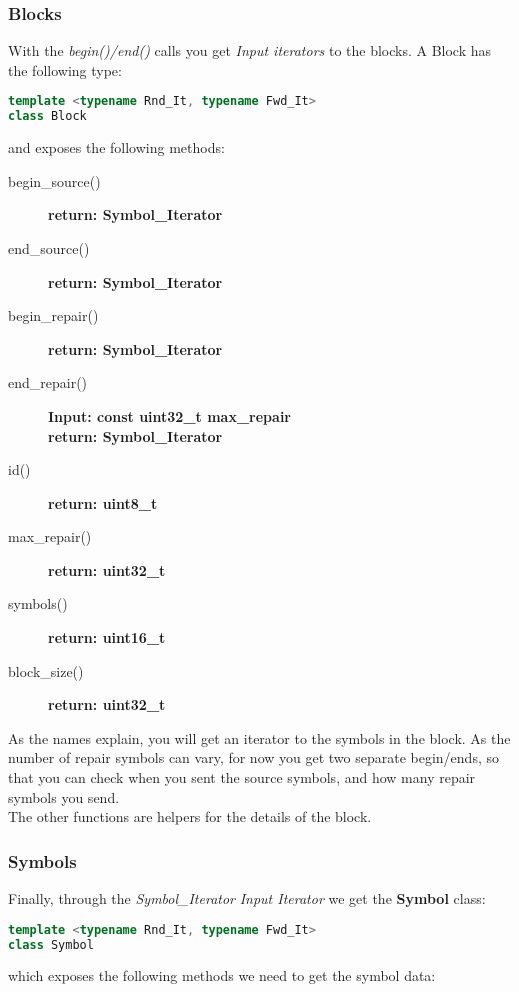 \documentclass[11pt,a4paper]{refart}
\begin{document}
\subsubsection{Blocks}
With the \textit{begin()/end()} calls you get \textit{Input iterators} to the blocks. A Block has the following type:
\begin{lstlisting}[language=C++]
template <typename Rnd_It, typename Fwd_It>
class Block
\end{lstlisting}
and exposes the	 following methods:
\begin{description}
\item[begin\_source()]\textbf{return: Symbol\_Iterator}
\item[end\_source()]\textbf{return: Symbol\_Iterator}
\item[begin\_repair()]\textbf{return: Symbol\_Iterator}
\item[end\_repair()]\textbf{Input: const uint32\_t max\_repair}\\
\textbf{return: Symbol\_Iterator}
\item[id()]\textbf{return: uint8\_t}
\item[max\_repair()]\textbf{return: uint32\_t}
\item[symbols()]\textbf{return: uint16\_t}
\item[block\_size()]\textbf{return: uint32\_t}
\end{description}

As the names explain, you will get an iterator to the symbols in the block. As the number of repair symbols can vary, for now you get two separate begin/ends,
so that you can check when you sent the source symbols, and how many repair symbols you send.\\
The other functions are helpers for the details of the block.


\subsubsection{Symbols}
Finally, through the \textit{Symbol\_Iterator} \textit{Input Iterator} we get the \textbf{Symbol} class:
\begin{lstlisting}[language=C++]
template <typename Rnd_It, typename Fwd_It>
class Symbol
\end{lstlisting}

which exposes the following methods we need to get the symbol data:
\end{document}
